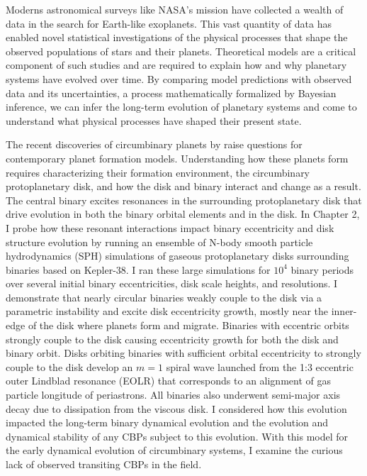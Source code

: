 Moderns astronomical surveys like NASA's \kepler mission have collected a wealth of data in the search for Earth-like exoplanets. This vast quantity of data has enabled novel statistical investigations of the physical processes that shape the observed populations of stars and their planets. Theoretical models are a critical component of such studies and are required to explain how and why planetary systems have evolved over time. By comparing model predictions with observed data and its uncertainties, a process mathematically formalized by Bayesian inference, we can infer the long-term evolution of planetary systems and come to understand what physical processes have shaped their present state.

The recent discoveries of circumbinary planets by \kepler raise questions for contemporary planet formation models.  Understanding how these planets form requires characterizing their formation environment, the circumbinary protoplanetary disk, and how the disk and binary interact and change as a result.  The central binary excites resonances in the surrounding protoplanetary disk that drive evolution in both the binary orbital elements and in the disk.  In Chapter 2, I probe how these resonant interactions impact binary eccentricity and disk structure evolution by running an ensemble of N-body smooth particle hydrodynamics (SPH) simulations of gaseous protoplanetary disks surrounding binaries based on Kepler-38. I ran these large simulations for $10^4$ binary periods over several initial binary eccentricities, disk scale heights, and resolutions.  I demonstrate that nearly circular binaries weakly couple to the disk via a parametric instability and excite disk eccentricity growth, mostly near the inner-edge of the disk where planets form and migrate.  Binaries with eccentric orbits strongly couple to the disk causing eccentricity growth for both the disk and binary orbit. Disks orbiting binaries with sufficient orbital eccentricity to strongly couple to the disk develop an $m = 1$ spiral wave launched from the 1:3 eccentric outer Lindblad resonance (EOLR) that corresponds to an alignment of gas particle longitude of periastrons. All binaries also underwent semi-major axis decay due to dissipation from the viscous disk. I considered how this evolution impacted the long-term binary dynamical evolution and the evolution and dynamical stability of any CBPs subject to this evolution. With this model for the early dynamical evolution of circumbinary systems, I examine the curious lack of observed transiting CBPs in the \kepler field.

